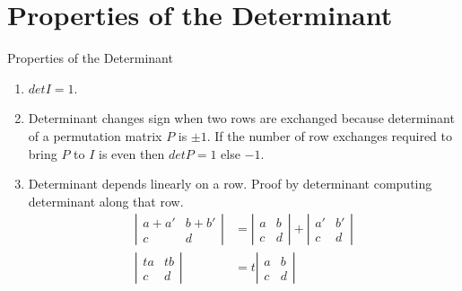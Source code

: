 \documentclass{beamer}
\begin{document}
\section{Properties of the Determinant}
\begin{frame}{Properties of the Determinant}
\begin{enumerate}
    \item $det I = 1$.
    \item Determinant changes sign when two rows are exchanged because determinant of a permutation matrix $P$ is $\pm 1$. If the number of row exchanges required to bring $P$ to $I$ is even then $detP = 1$ else $-1$.
    \item Determinant depends linearly on a row. Proof by determinant computing determinant along that row.
    \begin{align*}
        \left|\begin{matrix}a+a'&b+b'\\c&d\end{matrix}\right| &= \left|\begin{matrix}a&b\\c&d\end{matrix}\right|+\left|\begin{matrix}a'&b'\\c&d\end{matrix}\right|\\
        \left|\begin{matrix}ta&tb\\c&d\end{matrix}\right| &= t \left|\begin{matrix}a&b\\c&d\end{matrix}\right|
    \end{align*}
\end{enumerate}
\end{frame}
\end{document}
